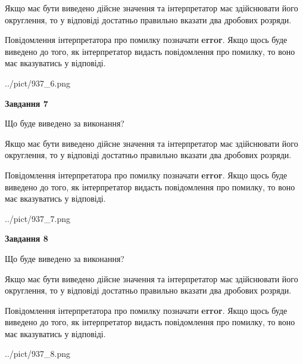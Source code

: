 \documentclass[12pt, ukrainian]{article}
\begin{document}
{\begin {Large}
Якщо має бути виведено дійсне значення та інтерпретатор має здійснювати його округлення, 
то у відповіді достатньо правильно вказати два дробових розряди.

Повідомлення інтерпретатора про помилку позначати \textbf{error}.
Якщо щось буде виведено до того, як інтерпретатор видасть повідомлення про помилку, 
то воно має вказуватись у відповіді. \par

\begin{center}
	{../pict/937_6.png}
\end{center}
\newpage

{\begin {center}\textbf{Завдання 7}\end {center}}\par
Що буде виведено за виконання? \par

Якщо має бути виведено дійсне значення та інтерпретатор має здійснювати його округлення, 
то у відповіді достатньо правильно вказати два дробових розряди.

Повідомлення інтерпретатора про помилку позначати \textbf{error}.
Якщо щось буде виведено до того, як інтерпретатор видасть повідомлення про помилку, 
то воно має вказуватись у відповіді. \par

\begin{center}
	{../pict/937_7.png}
\end{center}
\newpage

{\begin {center}\textbf{Завдання 8}\end {center}}\par
Що буде виведено за виконання? \par

Якщо має бути виведено дійсне значення та інтерпретатор має здійснювати його округлення, 
то у відповіді достатньо правильно вказати два дробових розряди.

Повідомлення інтерпретатора про помилку позначати \textbf{error}.
Якщо щось буде виведено до того, як інтерпретатор видасть повідомлення про помилку, 
то воно має вказуватись у відповіді. \par

\begin{center}
	{../pict/937_8.png}
\end{center}
\newpage


\end{Large}}
\end{document}
